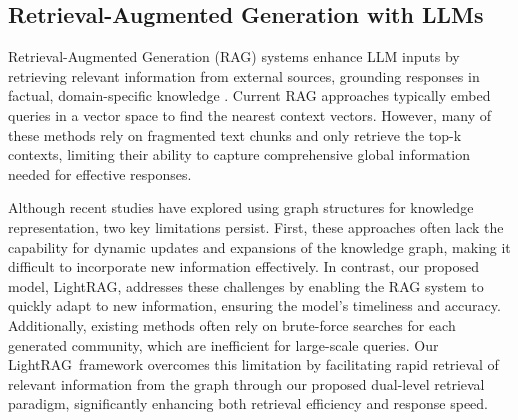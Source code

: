 \documentclass{article} %
\def\model{LightRAG}
\begin{document}
\subsection{Retrieval-Augmented Generation with LLMs}\vspace{-0.05in}
Retrieval-Augmented Generation (RAG) systems enhance LLM inputs by retrieving relevant information from external sources, grounding responses in factual, domain-specific knowledge \cite{ram2023context, fan2024survey}. Current RAG approaches \cite{hyde, gao2023retrieval, chan2024rq, yu2024rankrag} typically embed queries in a vector space to find the nearest context vectors. However, many of these methods rely on fragmented text chunks and only retrieve the top-k contexts, limiting their ability to capture comprehensive global information needed for effective responses.

Although recent studies \cite{edge2024local} have explored using graph structures for knowledge representation, two key limitations persist. First, these approaches often lack the capability for dynamic updates and expansions of the knowledge graph, making it difficult to incorporate new information effectively. In contrast, our proposed model, \model, addresses these challenges by enabling the RAG system to quickly adapt to new information, ensuring the model's timeliness and accuracy. Additionally, existing methods often rely on brute-force searches for each generated community, which are inefficient for large-scale queries. Our \model\ framework overcomes this limitation by facilitating rapid retrieval of relevant information from the graph through our proposed dual-level retrieval paradigm, significantly enhancing both retrieval efficiency and response speed.
\end{document}
